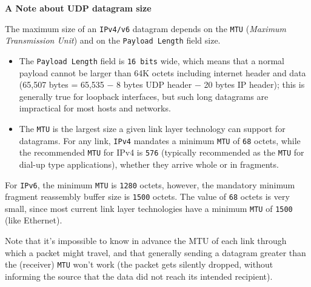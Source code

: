 \begin{Shaded}
\begin{Highlighting}[]
 \NormalTok{);}
  \NormalTok{);}
 \NormalTok{(}\NormalTok{);}
\NormalTok{, }\NormalTok{, }\NormalTok{, }\NormalTok{, }
  \NormalTok{();}
\NormalTok{\});}
\end{Highlighting}
\end{Shaded}

\textbf{A Note about UDP datagram size}

The maximum size of an \texttt{IPv4/v6} datagram depends on the
\texttt{MTU} (\emph{Maximum Transmission Unit}) and on the
\texttt{Payload Length} field size.

\begin{itemize}
\item
  The \texttt{Payload Length} field is \texttt{16 bits} wide, which
  means that a normal payload cannot be larger than 64K octets including
  internet header and data (65,507 bytes = 65,535 − 8 bytes UDP header −
  20 bytes IP header); this is generally true for loopback interfaces,
  but such long datagrams are impractical for most hosts and networks.
\item
  The \texttt{MTU} is the largest size a given link layer technology can
  support for datagrams. For any link, \texttt{IPv4} mandates a minimum
  \texttt{MTU} of \texttt{68} octets, while the recommended \texttt{MTU}
  for IPv4 is \texttt{576} (typically recommended as the \texttt{MTU}
  for dial-up type applications), whether they arrive whole or in
  fragments.
\end{itemize}

For \texttt{IPv6}, the minimum \texttt{MTU} is \texttt{1280} octets,
however, the mandatory minimum fragment reassembly buffer size is
\texttt{1500} octets. The value of \texttt{68} octets is very small,
since most current link layer technologies have a minimum \texttt{MTU}
of \texttt{1500} (like Ethernet).

Note that it's impossible to know in advance the MTU of each link
through which a packet might travel, and that generally sending a
datagram greater than the (receiver) \texttt{MTU} won't work (the packet
gets silently dropped, without informing the source that the data did
not reach its intended recipient).

